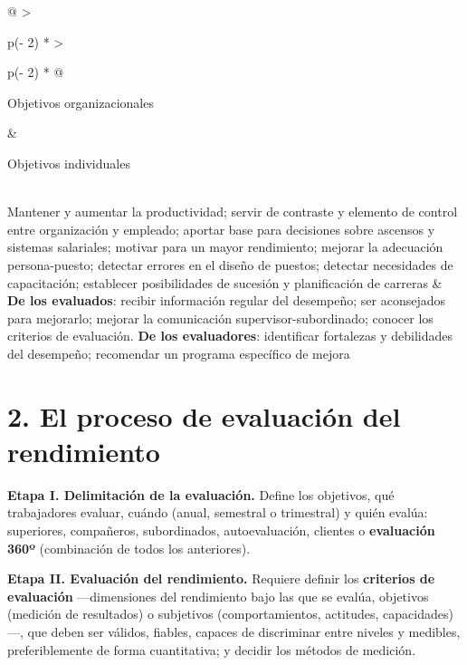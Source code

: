 \documentclass[12pt]{book} %
\begin{document}
\begin{longtable}[]{@{}
  >{\raggedright\arraybackslash}p{(\columnwidth - 2\tabcolsep) * }
  >{\raggedright\arraybackslash}p{(\columnwidth - 2\tabcolsep) * }@{}}
\toprule\noalign{}
\begin{minipage}[b]{\linewidth}\raggedright
Objetivos organizacionales
\end{minipage} & \begin{minipage}[b]{\linewidth}\raggedright
Objetivos individuales
\end{minipage} \\
\midrule\noalign{}
\endhead
\bottomrule\noalign{}
\endlastfoot
Mantener y aumentar la productividad; servir de contraste y elemento de
control entre organización y empleado; aportar base para decisiones
sobre ascensos y sistemas salariales; motivar para un mayor rendimiento;
mejorar la adecuación persona-puesto; detectar errores en el diseño de
puestos; detectar necesidades de capacitación; establecer posibilidades
de sucesión y planificación de carreras & \textbf{De los evaluados}:
recibir información regular del desempeño; ser aconsejados para
mejorarlo; mejorar la comunicación supervisor-subordinado; conocer los
criterios de evaluación. \textbf{De los evaluadores}: identificar
fortalezas y debilidades del desempeño; recomendar un programa
específico de mejora \\
\end{longtable}

\hypertarget{el-proceso-de-evaluaciuxf3n-del-rendimiento}{%
\section{2. El proceso de evaluación del
rendimiento}\label{el-proceso-de-evaluaciuxf3n-del-rendimiento}}

\textbf{Etapa I. Delimitación de la evaluación.} Define los objetivos,
qué trabajadores evaluar, cuándo (anual, semestral o trimestral) y quién
evalúa: superiores, compañeros, subordinados, autoevaluación, clientes o
\textbf{evaluación 360º} (combinación de todos los anteriores).

\textbf{Etapa II. Evaluación del rendimiento.} Requiere definir los
\textbf{criterios de evaluación} ---dimensiones del rendimiento bajo las
que se evalúa, objetivos (medición de resultados) o subjetivos
(comportamientos, actitudes, capacidades)---, que deben ser válidos,
fiables, capaces de discriminar entre niveles y medibles,
preferiblemente de forma cuantitativa; y decidir los métodos de
medición.
\end{document}
